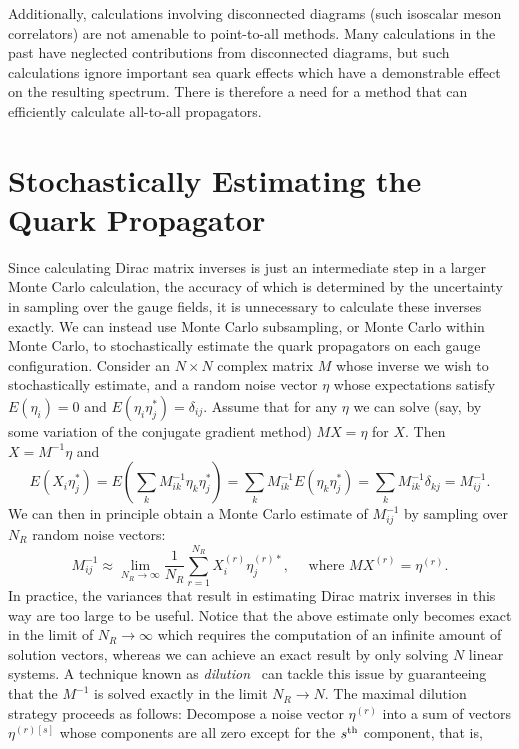 Additionally, calculations involving disconnected diagrams (such isoscalar meson correlators) are not amenable to point-to-all methods. Many calculations in the past have neglected contributions from disconnected diagrams, but such calculations ignore important sea quark effects which have a demonstrable effect on the resulting spectrum. There is therefore a need for a method that can efficiently calculate all-to-all propagators.
\section{Stochastically Estimating the Quark Propagator}
Since calculating Dirac matrix inverses is just an intermediate step in a larger Monte Carlo calculation, the accuracy of which is determined by the uncertainty in sampling over the gauge fields, it is unnecessary to calculate these inverses exactly. We can instead use Monte Carlo subsampling, or Monte Carlo within Monte Carlo, to stochastically estimate the quark propagators on each gauge configuration. Consider an $N\times N$ complex matrix $M$ whose inverse we wish to stochastically estimate, and a random noise vector $\eta$ whose expectations satisfy $E(\eta_i) = 0$ and $E(\eta_i \eta_j^*) = \delta_{ij}$. Assume that for any $\eta$ we can solve (say, by some variation of the conjugate gradient method) $MX=\eta$ for $X$. Then $X=M^{-1}\eta$ and
\begin{equation}
    E\left(X_{i} \eta_{j}^{*}\right)=E\left(\sum_{k} M_{i k}^{-1} \eta_{k} \eta_{j}^{*}\right)=\sum_{k} M_{i k}^{-1} E\left(\eta_{k} \eta_{j}^{*}\right)=\sum_{k} M_{i k}^{-1} \delta_{k j}=M_{i j}^{-1}.
\end{equation}
We can then in principle obtain a Monte Carlo estimate of $M^{-1}_{ij}$ by sampling over $N_R$ random noise vectors:
\begin{equation}
    M_{i j}^{-1} \approx \lim _{N_{R} \rightarrow \infty} \frac{1}{N_{R}} \sum_{r=1}^{N_{R}} X_{i}^{(r)} \eta_{j}^{(r) *}, \quad \text { where } M X^{(r)}=\eta^{(r)}.
\end{equation}
In practice, the variances that result in estimating Dirac matrix inverses in this way are too large to be useful. Notice that the above estimate only becomes exact in the limit of $N_R\rightarrow \infty$ which requires the computation of an infinite amount of solution vectors, whereas we can achieve an exact result by only solving $N$ linear systems. A technique known as \emph{dilution}~\cite{Foley:2005ac,Bernardson:1993he,Wilcox:1999ab} can tackle this issue by guaranteeing that the $M^{-1}$ is solved exactly in the limit $N_R\rightarrow N$. The maximal dilution strategy proceeds as follows: Decompose a noise vector $\eta^{(r)}$ into a sum of vectors $\eta^{(r)[s]}$ whose components are all zero except for the $s^{\rm{th}}$ component, that is,
